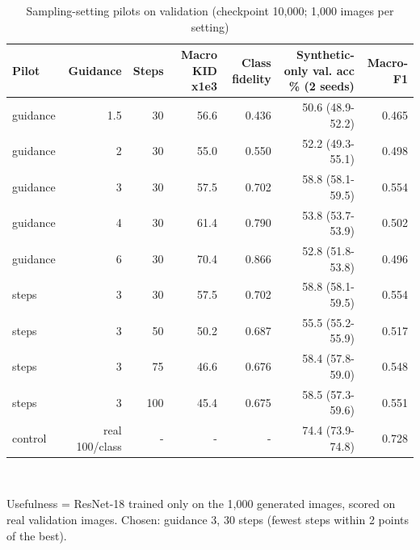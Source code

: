 \begin{table}[t]
\centering
\footnotesize
\caption{Sampling-setting pilots on validation (checkpoint 10,000; 1,000 images per setting)}
\label{tab:t05_sampling_pilots}
\begin{tabular}{lrrrrrr}
\toprule
Pilot & Guidance & Steps & Macro KID x1e3 & Class fidelity & Synthetic-only val. acc \% (2 seeds) & Macro-F1 \\
\midrule
guidance & 1.5 & 30 & 56.6 & 0.436 & 50.6 (48.9-52.2) & 0.465 \\
guidance & 2 & 30 & 55.0 & 0.550 & 52.2 (49.3-55.1) & 0.498 \\
guidance & 3 & 30 & 57.5 & 0.702 & 58.8 (58.1-59.5) & 0.554 \\
guidance & 4 & 30 & 61.4 & 0.790 & 53.8 (53.7-53.9) & 0.502 \\
guidance & 6 & 30 & 70.4 & 0.866 & 52.8 (51.8-53.8) & 0.496 \\
steps & 3 & 30 & 57.5 & 0.702 & 58.8 (58.1-59.5) & 0.554 \\
steps & 3 & 50 & 50.2 & 0.687 & 55.5 (55.2-55.9) & 0.517 \\
steps & 3 & 75 & 46.6 & 0.676 & 58.4 (57.8-59.0) & 0.548 \\
steps & 3 & 100 & 45.4 & 0.675 & 58.5 (57.3-59.6) & 0.551 \\
control & real 100/class & - & - & - & 74.4 (73.9-74.8) & 0.728 \\
\bottomrule
\end{tabular}
\\[2pt]\parbox{\linewidth}{\scriptsize Usefulness = ResNet-18 trained only on the 1,000 generated images, scored on real validation images. Chosen: guidance 3, 30 steps (fewest steps within 2 points of the best).}
\end{table}
